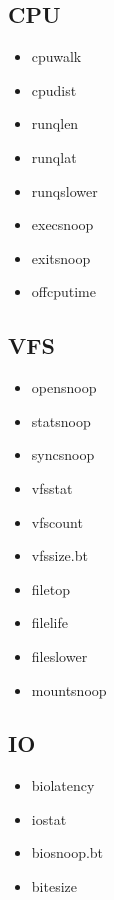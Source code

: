 \documentclass{beamer}
\begin{document}
\begin{Large}


\subsection{CPU}

\begin{frame}
	\begin{itemize}
		\item<+-> cpuwalk
		\item<+-> cpudist
		\item<+-> runqlen
		\item<+-> runqlat
		\item<+-> runqslower
		\item<+-> execsnoop
		\item<+-> exitsnoop
		\item<+-> offcputime
	\end{itemize}
\end{frame}

\subsection{VFS}
\begin{frame}
	\begin{itemize}
		\item<+-> opensnoop
		\item<+-> statsnoop 
		\item<+-> syncsnoop
		\item<+-> vfsstat
		\item<+-> vfscount
		\item<+-> vfssize.bt
		\item<+-> filetop
		\item<+-> filelife
		\item<+-> fileslower
		\item<+-> mountsnoop
	\end{itemize}
\end{frame}

\subsection{IO}
\begin{frame}
	\begin{itemize}
		\item<+-> biolatency
		\item<+-> iostat 
		\item<+-> biosnoop.bt
		\item<+-> bitesize
	\end{itemize}
\end{frame}


\end{Large}
\end{document}
